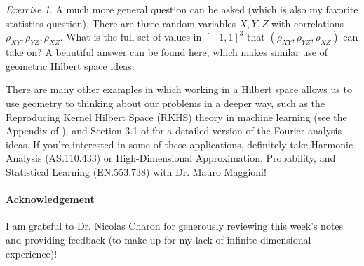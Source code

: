 \documentclass[11pt]{article}
\theoremstyle{plain}
\theoremstyle{definition}
\theoremstyle{remark}
\newtheorem{exc}{Exercise}[section]
\begin{document}
\begin{exc}
    A much more general question can be asked (which is also my favorite statistics question). There are three random variables $X, Y, Z$ with correlations $\rho_{XY}, \rho_{YZ}, \rho_{XZ}$. What is the full set of values in $[-1,1]^3$ that $(\rho_{XY}, \rho_{YZ}, \rho_{XZ})$ can take on? A beautiful answer can be found \href{https://math.stackexchange.com/questions/284877/correlation-between-three-variables-question}{here}, which makes similar use of geometric Hilbert space ideas.
\end{exc}

There are many other examples in which working in a Hilbert space allows us to use geometry to thinking about our problems in a deeper way, such as the Reproducing Kernel Hilbert Space (RKHS) theory in machine learning (see the Appendix of \citet{nonpar}), and Section 3.1 of \citet{fourier} for a detailed version of the Fourier analysis ideas. If you're interested in some of these applications, definitely take Harmonic Analysis (AS.110.433) or High-Dimensional Approximation, Probability, and Statistical Learning (EN.553.738) with Dr. Mauro Maggioni!

\paragraph{Acknowledgement} I am grateful to Dr. Nicolas Charon for generously reviewing this week's notes and providing feedback (to make up for my lack of infinite-dimensional experience)!

\newpage

\vspace{5mm}

%


\newpage
\end{document}
